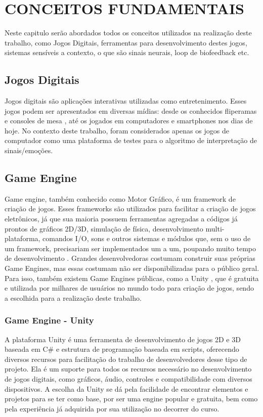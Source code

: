 \chapter{CONCEITOS FUNDAMENTAIS} \label{conceitos}

Neste capitulo serão abordados todos os conceitos utilizados na realização deste trabalho, como Jogos Digitais, ferramentas para desenvolvimento destes jogos, sistemas sensíveis a contexto, o que são sinais neurais, loop de biofeedback etc. 

\section{Jogos Digitais}
Jogos digitais são aplicações interativas utilizadas como entretenimento. Esses jogos podem ser apresentados em diversas mídias: desde os conhecidos fliperamas e consoles de mesa \cite{batista2018estudo}, até os jogados em computadores e smartphones nos dias de hoje. No contexto deste trabalho, foram considerados apenas os jogos de computador como uma plataforma de testes para o algoritmo de interpretação de sinais/emoções.

\section{Game Engine}
Game engine, também conhecido como Motor Gráfico, é um framework de criação de jogos. Esses frameworks são utilizados para facilitar a criação de jogos eletrônicos, já que sua maioria possuem ferramentas agregadas a códigos já prontos de gráficos 2D/3D, simulação de física, desenvolvimento multi-plataforma, comandos I/O, sons e outros sistemas e módulos que, sem o uso de um framework, precisariam ser implementados um a um, poupando muito tempo de desenvolvimento \cite{gameengine}. Grandes desenvolvedoras costumam construir suas próprias Game Engines, mas essas costumam não ser disponibilizadas para o público geral. Para isso, também existem Game Engines públicas, como a Unity \cite{Unitysite}, que é gratuita e utilizada por milhares de usuários no mundo todo para criação de jogos, sendo a escolhida para a realização deste trabalho.

\subsection{Game Engine - Unity}
A plataforma Unity é uma ferramenta de desenvolvimento de jogos 2D e 3D baseada em C\# e estrutura de programação baseada em scripts, oferecendo diversos recursos para facilitação do trabalho de desenvolvedores desse tipo de projeto. Ela é um suporte para todos os recursos necessário no desenvolvimento de jogos digitais, como gráficos, áudio, controles e compatibilidade com diversos dispositivos.
A escolha da Unity se dá pela facilidade de encontrar elementos e projetos para se ter como base, por ser uma engine popular e gratuita, bem como pela experiência já adquirida por sua utilização no decorrer do curso.


